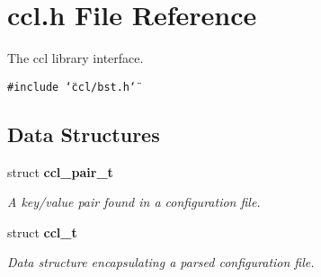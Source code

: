 \section{ccl.h File Reference}
\label{ccl_8h}
The ccl library interface.  


{\tt \#include \char`\"{}ccl/bst.h\char`\"{}}\par
\subsection*{Data Structures}
\begin{CompactItemize}
\item 
struct {\bf ccl\_\-pair\_\-t}
\begin{CompactList}\small\item\em A key/value pair found in a configuration file. \item\end{CompactList}\item 
struct {\bf ccl\_\-t}
\begin{CompactList}\small\item\em Data structure encapsulating a parsed configuration file. \item\end{CompactList}\end{CompactItemize}
